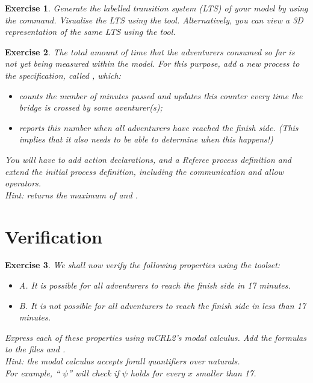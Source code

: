 \documentclass[11pt]{article}
\theoremstyle{myplain}
\newtheorem{exercise}{Exercise}
\theoremstyle{definition} %
\begin{document}
\begin{exercise}
  Generate the labelled transition system (LTS) of your model by using the  command.
Visualise the LTS using the  tool.
Alternatively, you can view a 3D representation of the same LTS using the  tool.
\end{exercise}


\begin{exercise}
The total amount of time that the adventurers consumed so far is not yet being measured within the model. For this purpose, add a new process to the specification, called , which:
\begin{itemize}
  \item counts the number of minutes passed and updates this counter every time the bridge is crossed by some aventurer(s);
  \item reports this number when all adventurers have reached the \emph{finish side}. (This implies that it also needs to be able to determine when this happens!)
\end{itemize}
You will have to add action declarations, and a \emph{Referee} process definition and extend the initial process definition, including the communication and allow operators.\\[1mm]
\emph{Hint:  returns the maximum of  and .} 
\end{exercise}


\section*{Verification}

\begin{exercise}
We shall now verify the following properties using the toolset:
\begin{itemize}
  \item A. It is possible for all adventurers to reach the finish side in 17 minutes.
  \item B. It is not possible for all adventurers to reach the finish side in less than 17 minutes.
\end{itemize}

Express each of these properties using mCRL2's modal calculus. Add the formulas to the files  and .
\\[2mm]
\emph{Hint: the modal calculus accepts forall quantifiers over naturals.}
\\\emph{For example, `` $\psi$'' will check if $\psi$ holds for every $x$ smaller than 17.}
\end{exercise}
\end{document}
